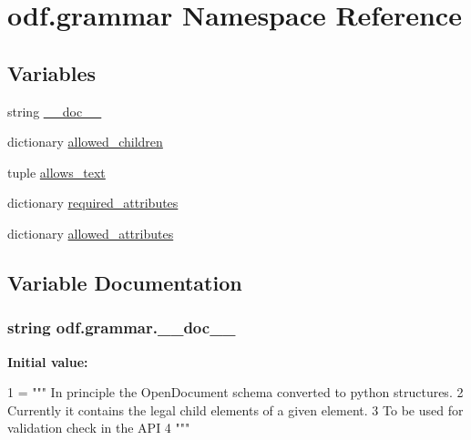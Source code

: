 \hypertarget{namespaceodf_1_1grammar}{\section{odf.\+grammar Namespace Reference}
\label{namespaceodf_1_1grammar}
}
\subsection*{Variables}
\begin{DoxyCompactItemize}
\item 
string \hyperlink{namespaceodf_1_1grammar_acef64e7e05d460461ee25112dae95882}{\+\_\+\+\_\+doc\+\_\+\+\_\+}
\item 
dictionary \hyperlink{namespaceodf_1_1grammar_afedffb9bc285b6d478b821ee6f27db49}{allowed\+\_\+children}
\item 
tuple \hyperlink{namespaceodf_1_1grammar_af74bda0d0f630e9047b1d30972fb8892}{allows\+\_\+text}
\item 
dictionary \hyperlink{namespaceodf_1_1grammar_a5a5da9502e3a9a572fe272da463f1877}{required\+\_\+attributes}
\item 
dictionary \hyperlink{namespaceodf_1_1grammar_a977fc09293e3ad44040d3d0dd5d76e50}{allowed\+\_\+attributes}
\end{DoxyCompactItemize}


\subsection{Variable Documentation}
\hypertarget{namespaceodf_1_1grammar_acef64e7e05d460461ee25112dae95882}{
\subsubsection[{\+\_\+\+\_\+doc\+\_\+\+\_\+}]{\setlength{\rightskip}{0pt plus 5cm}string odf.\+grammar.\+\_\+\+\_\+doc\+\_\+\+\_\+}}\label{namespaceodf_1_1grammar_acef64e7e05d460461ee25112dae95882}
{\bfseries Initial value\+:}
\begin{DoxyCode}
1 = \textcolor{stringliteral}{""" In principle the OpenDocument schema converted to python structures.}
2 \textcolor{stringliteral}{Currently it contains the legal child elements of a given element.}
3 \textcolor{stringliteral}{To be used for validation check in the API}
4 \textcolor{stringliteral}{"""}
\end{DoxyCode}


